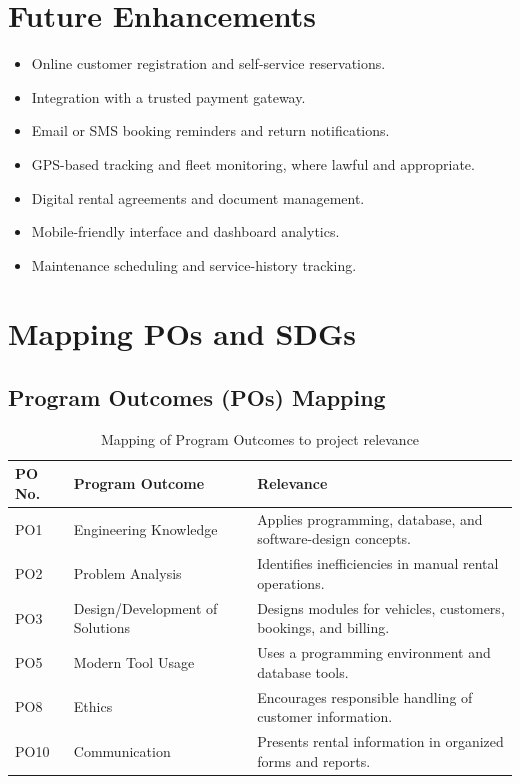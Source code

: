 \documentclass[11pt,a4paper]{report}
\begin{document}
\section{Future Enhancements}
\begin{itemize}
\item Online customer registration and self-service reservations.
\item Integration with a trusted payment gateway.
\item Email or SMS booking reminders and return notifications.
\item GPS-based tracking and fleet monitoring, where lawful and appropriate.
\item Digital rental agreements and document management.
\item Mobile-friendly interface and dashboard analytics.
\item Maintenance scheduling and service-history tracking.
\end{itemize}

\section{Mapping POs and SDGs}
\subsection{Program Outcomes (POs) Mapping}
\begin{longtable}{|p{1.5cm}|p{5cm}|p{6.5cm}|}
\caption{Mapping of Program Outcomes to project relevance}\\
\hline
\textbf{PO No.} & \textbf{Program Outcome} & \textbf{Relevance}\\ \hline
PO1 & Engineering Knowledge & Applies programming, database, and software-design concepts.\\ \hline
PO2 & Problem Analysis & Identifies inefficiencies in manual rental operations.\\ \hline
PO3 & Design/Development of Solutions & Designs modules for vehicles, customers, bookings, and billing.\\ \hline
PO5 & Modern Tool Usage & Uses a programming environment and database tools.\\ \hline
PO8 & Ethics & Encourages responsible handling of customer information.\\ \hline
PO10 & Communication & Presents rental information in organized forms and reports.\\ \hline
\end{longtable}
\end{document}
